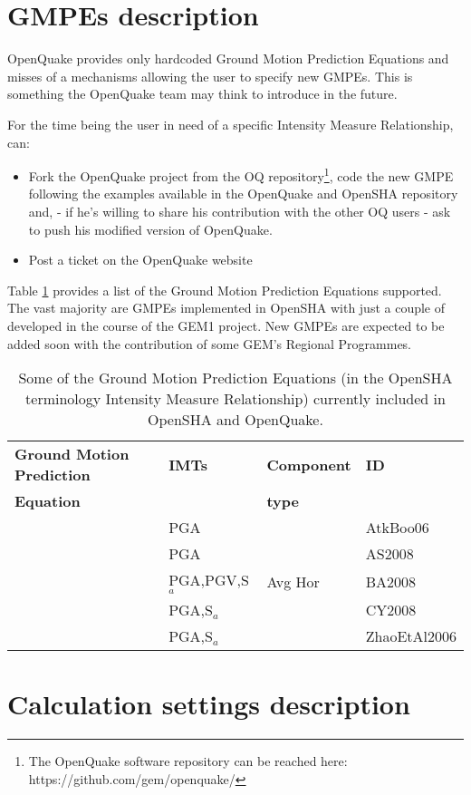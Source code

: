 \section{GMPEs description}
\label{hazard:gmpe_selection}
OpenQuake provides only hardcoded Ground Motion Prediction Equations and misses 
of a mechanisms allowing the user to specify new GMPEs. This is something the 
OpenQuake team may think to introduce in the future. 

For the time being the user in need of a specific Intensity Measure 
Relationship, can:
\begin{itemize}
\item Fork the OpenQuake project from the OQ repository\footnote{The 
OpenQuake software repository can be reached here: 
\hfill \newline  https://github.com/gem/openquake/}, code the new GMPE 
following the examples available in the OpenQuake and OpenSHA repository 
and, - if he's willing to share his contribution with the other OQ users - 
ask to push his modified version of OpenQuake. 
\item Post a ticket on the OpenQuake website  
\end{itemize}

Table \ref{tab:OQ_GMPEs} provides a list of the Ground Motion Prediction 
Equations supported. The vast majority are GMPEs implemented in OpenSHA 
with just a couple of developed in the course of the GEM1 project. 
New GMPEs are expected to be added soon with the contribution of 
some GEM's Regional Programmes.
%
\begin{table}[!t]
\centering
\begin{tabular}{llll} \hline
\textbf{Ground Motion Prediction} & \textbf{IMTs} & \textbf{Component } & \textbf{ID} \\
\textbf{Equation}& & \textbf{type} & \\ 
\hline
\cite{atkinson2006} & PGA & & AtkBoo06 \\
\cite{abrahamson2008} & PGA & & AS2008 \\
\cite{boore2008}  & PGA,PGV,S$_{a}$ & Avg Hor & BA2008 \\
\cite{chiou2008}  & PGA,S$_{a}$ &  & CY2008 \\
\cite{zhao2006}  & PGA,S$_{a}$ &  & ZhaoEtAl2006 \\
\hline
\end{tabular}
\caption{Some of the Ground Motion Prediction Equations (in the OpenSHA 
terminology Intensity Measure Relationship) currently included in OpenSHA 
and OpenQuake.}
\label{tab:OQ_GMPEs}
\end{table}
%
%
\section{Calculation settings description}
\label{hazard:calculation_settings}
%



